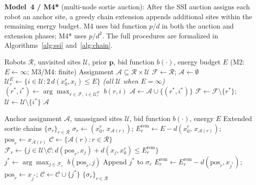 \documentclass[conference]{IEEEtran}
\begin{document}
\textbf{Model~4 / M4*} (multi-node sortie auction):
After the SSI auction assigns each robot an anchor site, a greedy chain
extension appends additional sites within the remaining energy budget.
M4 uses bid function $p/d$ in both the auction and extension phases; M4*
uses $p/d^2$.
The full procedures are formalized in Algorithms~\ref{alg:ssi}
and~\ref{alg:chain}.

\begin{algorithm}[ht]
\caption{Sequential Single-Item Auction (M2, M3, M4, M4*)}
\label{alg:ssi}
\begin{algorithmic}[1]
\REQUIRE Robots $\mathcal{R}$, unvisited sites $\mathcal{U}$, prior $\mathbf{p}$,
         bid function $b(\cdot)$, energy budget $E$
         \hspace{1.5em}(M2: $E\leftarrow\infty$; M3/M4: finite)
\ENSURE  Assignment $\mathcal{A} \subseteq \mathcal{R} \times \mathcal{U}$
\STATE $\mathcal{F} \leftarrow \mathcal{R}$; \quad $\mathcal{A} \leftarrow \emptyset$
    \STATE $\mathcal{U}_r^E \leftarrow \{i \in \mathcal{U} : 2\,d(x_0^r, x_i) \leq E\}$
    \hspace{0.5em} {\small\textit{(all $\mathcal{U}$ when $E{=}\infty$)}}
  \ENDFOR
  \STATE $(r^*, i^*) \leftarrow \arg\max_{r \in \mathcal{F},\; i \in \mathcal{U}_r^E}\; b(r, i)$
  \STATE $\mathcal{A} \leftarrow \mathcal{A} \cup \{(r^*, i^*)\}$
  \STATE $\mathcal{F} \leftarrow \mathcal{F} \setminus \{r^*\}$; \quad
         $\mathcal{U} \leftarrow \mathcal{U} \setminus \{i^*\}$
\ENDWHILE
\RETURN $\mathcal{A}$
\end{algorithmic}
\end{algorithm}

\begin{algorithm}[ht]
\caption{Greedy Chain Extension (M4, M4*)}
\label{alg:chain}
\begin{algorithmic}[1]
\REQUIRE Anchor assignment $\mathcal{A}$, unassigned sites $\mathcal{U}$,
         bid function $b(\cdot)$, energy $E$
\ENSURE  Extended sortie chains $\{\sigma_r\}_{r \in \mathcal{R}}$
  \STATE $\sigma_r \leftarrow (x_0^r,\, x_{\mathcal{A}(r)})$; \quad
         $E_r^{\mathrm{rem}} \leftarrow E - d(x_0^r,\, x_{\mathcal{A}(r)})$; \quad
         $\mathrm{pos}_r \leftarrow x_{\mathcal{A}(r)}$
\ENDFOR
\STATE $\mathcal{C} \leftarrow \{\mathcal{A}(r) : r \in \mathcal{R}\}$
\REPEAT
    \STATE $\mathcal{F}_r \!\leftarrow\! \{j \!\in\! \mathcal{U}\!\setminus\!\mathcal{C} :
           d(\mathrm{pos}_r, x_j) + d(x_j, x_0^r) \leq E_r^{\mathrm{rem}}\}$
      \STATE $j^* \leftarrow \arg\max_{j \in \mathcal{F}_r}\; b(\mathrm{pos}_r, j)$
      \STATE Append $j^*$ to $\sigma_r$
      \STATE $E_r^{\mathrm{rem}} \leftarrow E_r^{\mathrm{rem}} - d(\mathrm{pos}_r, x_{j^*})$; \quad
             $\mathrm{pos}_r \leftarrow x_{j^*}$; \quad
             $\mathcal{C} \leftarrow \mathcal{C} \cup \{j^*\}$
    \ENDIF
  \ENDFOR
{}
\RETURN $\{\sigma_r\}_{r \in \mathcal{R}}$
\end{algorithmic}
\end{algorithm}
\end{document}
